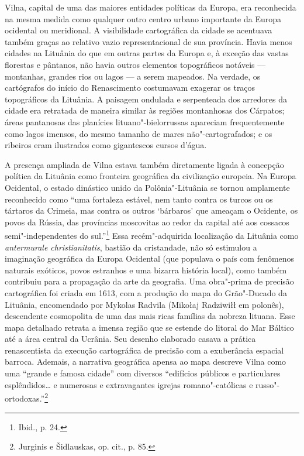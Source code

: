 Vilna, capital de uma das maiores entidades políticas da Europa, era
reconhecida na mesma medida como qualquer outro centro urbano importante
da Europa ocidental ou meridional. A visibilidade cartográfica da cidade
se acentuava também graças ao relativo vazio representacional de sua
província. Havia menos cidades na Lituânia do que em outras partes da
Europa e, à exceção das vastas florestas e pântanos, não havia outros
elementos topográficos notáveis --- montanhas, grandes rios ou lagos --- a
serem mapeados. Na verdade, os cartógrafos do início do Renascimento
costumavam exagerar os traços topográficos da Lituânia. A paisagem
ondulada e serpenteada dos arredores da cidade era retratada de maneira
similar às regiões montanhosas dos Cárpatos; áreas pantanosas das
planícies lituano"-bielorrussas apareciam frequentemente como lagos
imensos, do mesmo tamanho de mares não"-cartografados; e os ribeiros eram
ilustrados como gigantescos cursos d'água.

A presença ampliada de Vilna estava também diretamente ligada à
concepção política da Lituânia como fronteira geográfica da civilização
europeia. Na Europa Ocidental, o estado dinástico unido da
Polônia"-Lituânia se tornou amplamente reconhecido como ``uma fortaleza
estável, nem tanto contra os turcos ou os tártaros da Crimeia, mas
contra os outros `bárbaros' que ameaçam o Ocidente, os povos da Rússia,
das províncias moscovitas ao redor da capital até aos cossacos
semi"-independentes do sul.''\footnote{Ibid., p. 24.} Essa
recém"-adquirida localização da Lituânia como \textit{antermurale
christianitatis}, bastião da cristandade, não só estimulou a imaginação
geográfica da Europa Ocidental (que populava o país com fenômenos
naturais exóticos, povos estranhos e uma bizarra história local), como
também contribuiu para a propagação da arte da geografia. Uma obra"-prima
de precisão cartográfica foi criada em 1613, com a produção do mapa do
Grão"-Ducado da Lituânia, encomendado por Mykolas Radvila (Mikołaj
Radziwiłł em polonês), descendente cosmopolita de uma das mais ricas
famílias da nobreza lituana. Esse mapa detalhado retrata a imensa região
que se estende do litoral do Mar Báltico até a área central da Ucrânia.
Seu desenho elaborado casava a prática renascentista da execução
cartográfica de precisão com a exuberância espacial barroca. Ademais, a
narrativa geográfica apensa ao mapa descreve Vilna como uma ``grande e
famosa cidade'' com diversos ``edifícios públicos e particulares
esplêndidos\ldots{} e numerosas e extravagantes igrejas romano"-católicas
e russo"-ortodoxas.''\footnote{Jurginis e Šidlauskas, op. cit., p. 85.}

